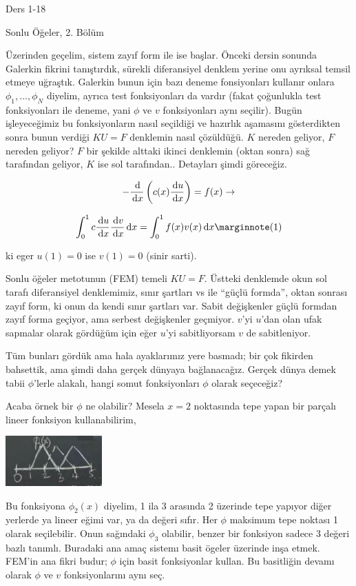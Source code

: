 \documentclass[12pt,fleqn]{article}\usepackage{../../common}
\begin{document}
Ders 1-18

Sonlu Öğeler, 2. Bölüm

Üzerinden geçelim, sistem zayıf form ile ise başlar. Önceki dersin sonunda
Galerkin fikrini tanıştırdık, sürekli diferansiyel denklem yerine onu ayrıksal
temsil etmeye uğraştık. Galerkin bunun için bazı deneme fonsiyonları kullanır
onlara $\phi_1,...,\phi_N$ diyelim, ayrıca test fonksiyonları da vardır (fakat
çoğunlukla test fonksiyonları ile deneme, yani $\phi$ ve $v$ fonksiyonları aynı
seçilir). Bugün işleyeceğimiz bu fonksiyonların nasıl seçildiği ve hazırlık
aşamasını gösterdikten sonra bunun verdiği $KU = F$ denklemin nasıl
çözüldüğü. $K$ nereden geliyor, $F$ nereden geliyor? $F$ bir şekilde alttaki
ikinci denklemin (oktan sonra) sağ tarafından geliyor, $K$ ise sol
tarafından.. Detayları şimdi göreceğiz.

$$
- \frac{\,\mathrm{d}}{\,\mathrm{d} x} \left( c(x) \frac{\,\mathrm{d} u}{\,\mathrm{d} x} \right) = f(x) \to
$$

$$
\int _{0}^{1} c \frac{\ud u}{\ud x} \frac{\ud v}{\ud x} \ud x =
\int _{0}^{1} f(x) v(x) \ud x
\mlabel{1}
$$

ki eger $u(1)=0$ ise $v(1) = 0$ (sinir sarti).

Sonlu öğeler metotunun (FEM) temeli $KU = F$. Üstteki denklemde okun sol tarafı
diferansiyel denklemimiz, sınır şartları vs ile ``güçlü formda'', oktan sonrası
zayıf form, ki onun da kendi sınır şartları var. Sabit değişkenler güçlü formdan
zayıf forma geçiyor, ama serbest değişkenler geçmiyor. $v$'yi $u$'dan olan ufak
sapmalar olarak gördüğüm için eğer $u$'yi sabitliyorsam $v$ de sabitleniyor.

Tüm bunları gördük ama hala ayaklarımız yere basmadı; bir çok fikirden
bahsettik, ama şimdi daha gerçek dünyaya bağlanacağız. Gerçek dünya demek tabii
$\phi$'lerle alakalı, hangi somut fonksiyonları $\phi$ olarak seçeceğiz?

Acaba örnek bir $\phi$ ne olabilir? Mesela $x=2$ noktasında tepe yapan bir
parçalı lineer fonksiyon kullanabilirim,

\includegraphics[width=10em]{compscieng_1_18_01.png}

Bu fonksiyona $\phi_2(x)$ diyelim, 1 ila 3 arasında 2 üzerinde tepe yapıyor
diğer yerlerde ya lineer eğimi var, ya da değeri sıfır. Her $\phi$ maksimum tepe
noktası 1 olarak seçilebilir. Onun sağındaki $\phi_3$ olabilir, benzer bir
fonksiyon sadece 3 değeri bazlı tanımlı. Buradaki ana amaç sistemı basit ögeler
üzerinde inşa etmek. FEM'in ana fikri budur; $\phi$ için basit fonksiyonlar
kullan. Bu basitliğin devamı olarak $\phi$ ve $v$ fonksiyonlarını aynı seç.
\end{document}
